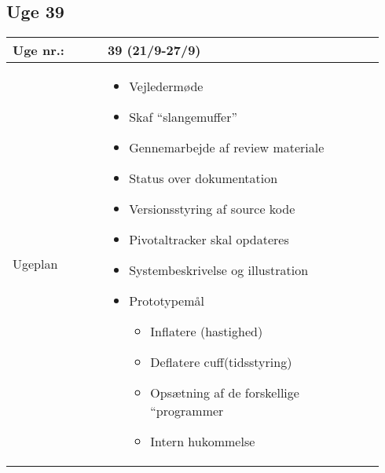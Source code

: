 	\subsection{Uge 39} \label{app:logUge39}
	\begin{longtable}{|p{0.24\linewidth}|p{0.7\linewidth}|}
		\hline
		Uge nr.: & 39 (21/9-27/9)\\ \hline
		Ugeplan & 
		\begin{itemize}
			\item Vejledermøde 
			\item Skaf “slangemuffer”
			\item Gennemarbejde af review materiale 
			\item Status over dokumentation
			\item Versionsstyring af source kode
			\item Pivotaltracker skal opdateres
			\item Systembeskrivelse og illustration 
			\item Prototypemål
			\begin{itemize}
				\item Inflatere (hastighed) 
				\item Deflatere cuff(tidsstyring)
				\item Opsætning af de forskellige “programmer
				\item Intern hukommelse
			\end{itemize}
		\end{itemize}
	

\end{longtable}
